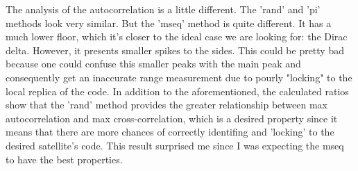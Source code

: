 The analysis of the autocorrelation is a little different. The 'rand' and 'pi'
methods look very similar. But the 'mseq' method is quite different. It has a
much lower floor, which it's closer to the ideal case we are looking for: the
Dirac delta. However, it presents smaller spikes to the sides. This could be
pretty bad because one could confuse this smaller peaks with the main peak and
consequently get an inaccurate range measurement due to pourly "locking" to the
local replica of the code. In addition to the aforementioned, the calculated
ratios show that the 'rand' method provides the greater relationship between
max autocorrelation and max cross-correlation, which is a desired property since
it means that there are more chances of correctly identifing and 'locking' to
the desired satellite's code. This result surprised me since I was expecting the
mseq to have the best properties.
